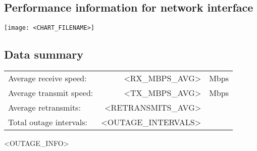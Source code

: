 \subsection{Performance information for network interface }
\begin{center}
\texttt{[image: <CHART\_FILENAME>]}
\end{center}

\subsection{Data summary}

\medskip
\begin{tabular}{@{}l@{\hskip 0.1in}r@{\hskip 0.025in}l@{}}
Average receive speed: & <RX_MBPS_AVG> & Mbps \\
Average transmit speed: & <TX_MBPS_AVG> & Mbps \\
Average retransmits: & <RETRANSMITS_AVG> &  \\
Total outage intervals: & <OUTAGE_INTERVALS> & \\
\end{tabular}

\medskip

<OUTAGE_INFO>

\pagebreak

